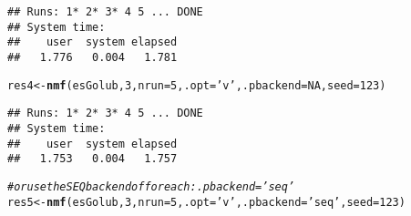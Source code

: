 \documentclass[a4paper]{article}\usepackage[]{graphicx}\usepackage[]{color}
\makeatletter
\newcommand{\hlnum}[1]{\textcolor[rgb]{0.686,0.059,0.569}{#1}}%
\newcommand{\hlstr}[1]{\textcolor[rgb]{0.192,0.494,0.8}{#1}}%
\newcommand{\hlcom}[1]{\textcolor[rgb]{0.678,0.584,0.686}{\textit{#1}}}%
\newcommand{\hlstd}[1]{\textcolor[rgb]{0.345,0.345,0.345}{#1}}%
\newcommand{\hlkwb}[1]{\textcolor[rgb]{0.69,0.353,0.396}{#1}}%
\newcommand{\hlkwc}[1]{\textcolor[rgb]{0.333,0.667,0.333}{#1}}%
\newcommand{\hlkwd}[1]{\textcolor[rgb]{0.737,0.353,0.396}{\textbf{#1}}}%
\newenvironment{kframe}{%
 \def\at@end@of@kframe{}%
 \ifinner\ifhmode%
  \def\at@end@of@kframe{\end{minipage}}%
  \begin{minipage}{\columnwidth}%
 \fi\fi%
 \def\FrameCommand##1{\hskip\@totalleftmargin \hskip-\fboxsep
 \colorbox{shadecolor}{##1}\hskip-\fboxsep
     \hskip-\linewidth \hskip-\@totalleftmargin \hskip\columnwidth}%
 \MakeFramed {\advance\hsize-\width
   \@totalleftmargin\z@ \linewidth\hsize
   \@setminipage}}%
 {\par\unskip\endMakeFramed%
 \at@end@of@kframe}
\newenvironment{knitrout}{}{} %
\makeatother
\begin{document}
\begin{knitrout}
\begin{kframe}
{\ttfamily\noindent\itshape\color{messagecolor}{\#\# NMF algorithm: 'brunet'\\\#\# Multiple runs: 5\\\#\# Mode: sequential [sapply]}}\begin{verbatim}
## Runs: 1* 2* 3* 4 5 ... DONE
## System time:
##    user  system elapsed 
##   1.776   0.004   1.781
\end{verbatim}
\begin{alltt}
\hlstd{res4} \hlkwb{<-} \hlkwd{nmf}\hlstd{(esGolub,} \hlnum{3}\hlstd{,} \hlkwc{nrun}\hlstd{=}\hlnum{5}\hlstd{,} \hlkwc{.opt}\hlstd{=}\hlstr{'v'}\hlstd{,} \hlkwc{.pbackend}\hlstd{=}\hlnum{NA}\hlstd{,} \hlkwc{seed}\hlstd{=}\hlnum{123}\hlstd{)}
\end{alltt}


{\ttfamily\noindent\itshape\color{messagecolor}{\#\# NMF algorithm: 'brunet'\\\#\# Multiple runs: 5\\\#\# Mode: sequential [sapply]}}\begin{verbatim}
## Runs: 1* 2* 3* 4 5 ... DONE
## System time:
##    user  system elapsed 
##   1.753   0.004   1.757
\end{verbatim}
\begin{alltt}
\hlcom{# or use the SEQ backend of foreach: .pbackend='seq'}
\hlstd{res5} \hlkwb{<-} \hlkwd{nmf}\hlstd{(esGolub,} \hlnum{3}\hlstd{,} \hlkwc{nrun}\hlstd{=}\hlnum{5}\hlstd{,} \hlkwc{.opt}\hlstd{=}\hlstr{'v'}\hlstd{,} \hlkwc{.pbackend}\hlstd{=}\hlstr{'seq'}\hlstd{,} \hlkwc{seed}\hlstd{=}\hlnum{123}\hlstd{)}
\end{alltt}



\end{kframe}
\end{knitrout}
\end{document}
